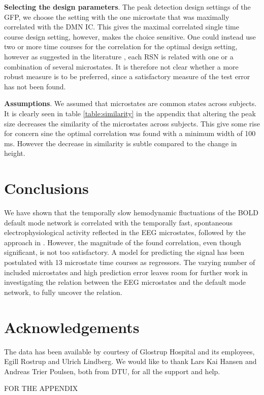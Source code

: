 \documentclass{article}
\begin{document}
\textbf{Selecting the design parameters}. The peak detection design settings of the GFP, we choose the setting with the one microstate that was maximally correlated with the DMN IC. This gives the maximal correlated single time course design setting, however, makes the choice sensitive. One could instead use two or more time courses for the correlation for the optimal design setting, however as suggested in the literature \cite{Yuan20122062}, each RSN is related with one or a combination of several microstates. It is therefore not clear whether a more robust measure is to be preferred, since a satisfactory measure of the test error has not been found.

\textbf{Assumptions}. We assumed that microstates are common states across subjects. It is clearly seen in table \ref{table:similarity} in the appendix that altering the peak size decreases the similarity of the microstates across subjects. This give some rise for concern sine the optimal correlation was found with a minimum width of 100 ms. However the decrease in similarity is subtle compared to the change in height.


\section{Conclusions}
We have shown that the temporally slow hemodynamic fluctuations of the BOLD default mode network is correlated with the temporally fast, spontaneous electrophysiological activity reflected in the EEG microstates, followed by the approach in \cite{Yuan20122062}. However, the magnitude of the found correlation, even though significant, is not too satisfactory. A model for predicting the signal has been postulated with 13 microstate time courses as regressors. The varying number of included microstates and high prediction error leaves room for further work in investigating the relation between the EEG microstates and the default mode network, to fully uncover the relation.

\section{Acknowledgements}
The data has been available by courtesy of Glostrup Hospital and its employees, Egill Rostrup and Ulrich Lindberg. We would like to thank Lars Kai Hansen and
Andreas Trier Poulsen, both from DTU, for all the support and help.



\newpage
FOR THE APPENDIX
\end{document}
